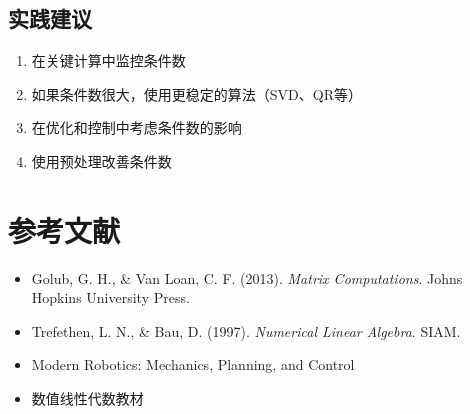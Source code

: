 \documentclass[12pt,a4paper]{article}
\begin{document}
\subsection{实践建议}

\begin{enumerate}
\item 在关键计算中监控条件数
\item 如果条件数很大，使用更稳定的算法（SVD、QR等）
\item 在优化和控制中考虑条件数的影响
\item 使用预处理改善条件数
\end{enumerate}

\section{参考文献}

\begin{itemize}
\item Golub, G. H., \& Van Loan, C. F. (2013). \textit{Matrix Computations}. Johns Hopkins University Press.
\item Trefethen, L. N., \& Bau, D. (1997). \textit{Numerical Linear Algebra}. SIAM.
\item Modern Robotics: Mechanics, Planning, and Control
\item 数值线性代数教材
\end{itemize}
\end{document}
